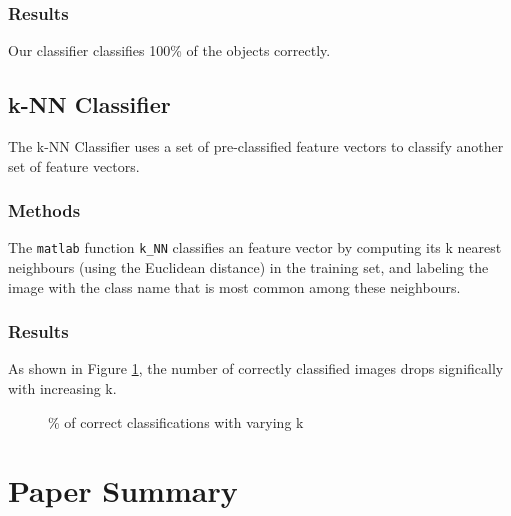 \documentclass[a4paper,psfig,subfigure,epsfig,fleqn,amssmb,float,caption,fontenc,ausarbeitung]{article}
\begin{document}
\subsubsection{Results}
\label{sec:ownResults}
Our classifier classifies 100\% of the objects correctly.

\subsection{k-NN Classifier}
\label{sec:kNN}
The k-NN Classifier uses a set of pre-classified feature vectors to classify another set of feature vectors.

\subsubsection{Methods}
\label{sec:kNNMethods}
The {\tt matlab} function {\tt k\_NN} classifies an feature vector by computing its k nearest neighbours (using the Euclidean distance) in the training set, and labeling the image with the class name that is most common among these neighbours.

\subsubsection{Results}
\label{sec:kNNResults}
As shown in Figure \ref{fig:results}, the number of correctly classified images drops significally with increasing k.
\begin{figure}
	\centering
	\setlength\figureheight{7cm} 
	\setlength\figurewidth{9cm}
	
	\caption{\% of correct classifications with varying k}
	\label{fig:results}
\end{figure}

\section{Paper Summary}
\label{sec:paperSummary}
\cite{beyer1999nearest}



\fontsize{9}{10pt}


\end{document}
